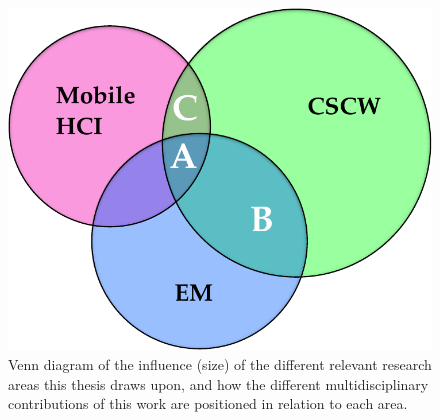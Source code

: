 \begin{figure}[H]
    \centering
    \includegraphics[width=.55\textwidth]{Graphics/1-Introduction/Contributions}
    \caption[Overlap of the different relevant research disciplines and positioning of this thesis' contributions.]{Venn diagram of the influence (size) of the different relevant research areas this thesis draws upon, and how the different multidisciplinary contributions of this work are positioned in relation to each area.}\label{fig:intro contributions}
\end{figure}





